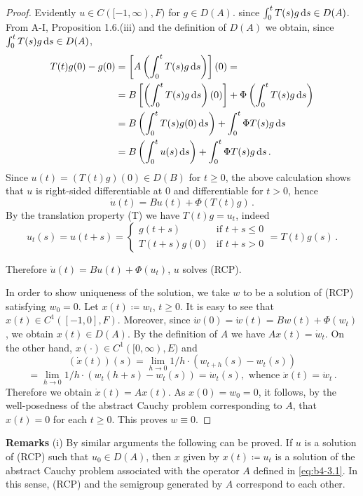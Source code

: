 \begin{proof} Evidently $u \in C([-1,\infty),F)$ for $g \in D(A)$.
since $\int_{0}^{t} T(s)g \mathop{}\!\mathrm{d}{s}  \in D(A)$.
From A-I, Proposition 1.6.(iii) and the definition of $D(A)$ we obtain,
since $\int_{0}^{t} T(s)g \mathop{}\!\mathrm{d}{s}  \in D(A)$,
\begin{align*}
	T(t)g(0) - g(0) &= \left[A\left(\int_{0}^{t} T(s)g  \mathop{}\!\mathrm{d}{s} \right)\right](0) = \\
	&= B\left[\left(\int_{0}^{t} T(s)g \mathop{}\!\mathrm{d}{s}\right)(0)\right] + \Phi\left(\int_{0}^{t} T(s)g \mathop{}\!\mathrm{d}{s} \right) \\
	&= B\left(\int_{0}^{t} T(s)g(0) \mathop{}\!\mathrm{d}{s}\right) + \int_{0}^{t} \Phi T(s)g \mathop{}\!\mathrm{d}{s}  \\
	&= B\left(\int_{0}^{t} u(s) \mathop{}\!\mathrm{d}{s}\right)  + \int_{0}^{t} \Phi T(s)g \mathop{}\!\mathrm{d}{s}\,.
\end{align*}
%
\newpage
%
Since $u(t) = (T(t)g)(0) \in D(B)$ for $t \geq 0$, the above calculation shows that $u$ is right-sided differentiable at $0$ and differentiable for $t > 0$, hence
\[
\dot{u}(t) = Bu(t) + \Phi(T(t)g)\,.
\]
By the translation property (T) we have $T(t)g = u_t$, indeed
\[
u_t(s) = u(t+s) = 
\begin{cases}
	g(t+s) & \text{if } t+s \leq 0 \\
	T(t+s)g(0) & \text{if } t+s > 0
\end{cases}
= T(t)g(s)\,.
\]

Therefore $\dot{u}(t) = Bu(t) + \Phi(u_t)$, \ie $u$ solves (RCP).

In order to show uniqueness of the solution, we take $w$ to be a solution of (RCP) satisfying $w_{0} = 0$. 
Let $x(t) \coloneq  w_t$, $t \geq 0$. 
It is easy to see that $x(t) \in C^1([-1,0],F)$. Moreover, since $\dot{w}(0) = \dot{w}(t) = Bw(t) + \Phi(w_t)$, we obtain $x(t) \in D(A)$. 
By the definition of $A$ we have $Ax(t) = \dot{w}_t$. 
On the other hand, $x(\cdot) \in C^1([0,\infty),E)$ and
\[
(\dot{x}(t))(s) = \lim_{h \to 0} 1/h \cdot (w_{t+h}(s) - w_t(s))
\]
\[
= \lim_{h \to 0} 1/h \cdot (w_t(h+s) - w_t(s)) = \dot{w}_t(s), \text{ whence } \dot{x}(t) = \dot{w}_t\,.
\]
Therefore we obtain $\dot{x}(t) = Ax(t)$. 
As $x(0) = w_{0} = 0$, it follows, by the well-posedness of the abstract Cauchy problem corresponding to $A$,  that $x(t) = 0$ for each $t \geq 0$. 
This proves $w \equiv 0$.
\end{proof}

\noindent
\textbf{Remarks}\quad 
(i) By similar arguments the following can be proved. If $u$ is a solution of (RCP) such that $u_{0} \in D(A)$, then $x$ given by $x(t) \coloneq  u_t$ is a solution of the abstract Cauchy problem associated with the operator $A$ defined in \eqref{eq:b4-3.1}. 
In this sense, (RCP) and the semigroup generated by $A$ correspond to each other.

